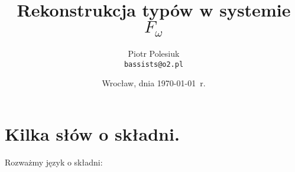 \documentclass[11pt,leqno]{article}
\title{{\textbf{Rekonstrukcja typów w systemie $F_{\omega}$}}\\[1ex]}
\date{Wrocław, dnia \today\ r.}
\author{Piotr Polesiuk \\ \texttt{bassists@o2.pl}}
\begin{document}
\thispagestyle{empty}
\maketitle

\pagebreak

\theoremstyle{plain}
\newtheorem{twierdzenie}{Twierdzenie}
\newtheorem{lemat}{Lemat}

\theoremstyle{definition}
\newtheorem{definicja}{Definicja}

\section{Kilka słów o składni.}
\setcounter{equation}{0}

Rozważmy język o składni:
\end{document}
